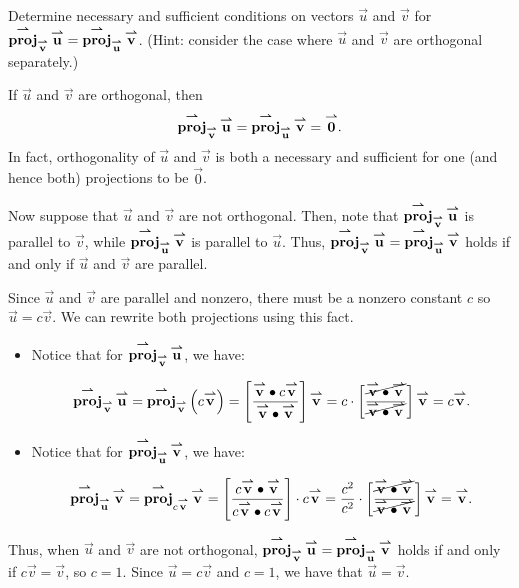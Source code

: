 \documentclass[noauthor, handout]{ximera}
\begin{document}
\begin{problem}
Determine necessary and sufficient conditions on vectors $\vec{u}$ and $\vec{v}$ for $\proj_\vec{v} \vec{u} = \proj_\vec{u} \vec{v}$. (Hint: consider the case where $\vec{u}$ and $\vec{v}$ are orthogonal separately.)

\begin{freeResponse}
If $\vec{u}$ and $\vec{v}$ are orthogonal, then
$$
\proj_\vec{v} \vec{u} = \proj_\vec{u} \vec{v} = \vec{0}.
$$
In fact, orthogonality of $\vec{u}$ and $\vec{v}$ is both a necessary and sufficient for one (and hence both) projections to be $\vec{0}$. 

Now suppose that $\vec{u}$ and $\vec{v}$ are not orthogonal. Then, note that $\proj_\vec{v} \vec{u}$ is parallel to $\vec{v}$, while $\proj_\vec{u} \vec{v}$ is parallel to $\vec{u}$.  Thus, $\proj_\vec{v} \vec{u}=\proj_\vec{u} \vec{v}$ holds if and only if $\vec{u}$ and $\vec{v}$ are parallel.

Since $\vec{u}$ and $\vec{v}$ are parallel and nonzero, there must be a nonzero constant $c$ so $\vec{u} = c \vec{v}$.  We can rewrite both projections using this fact.

\begin{itemize}
\item Notice that for $\proj_{\vec{v} } \vec{u}$, we have:

\[
\proj_{\vec{v} } \vec{u} = \proj_{\vec{v} } \left(c \vec{v}\right) = \left[\frac{\vec{v} \dotp c \vec{v}}{\vec{v} \dotp \vec{v} }\right] \vec{v} = c \cdot \left[\frac{\cancel{\vec{v} \dotp  \vec{v}}}{\cancel{\vec{v} \dotp \vec{v} }}\right] \vec{v} = c\vec{v}.
\]
\item Notice that for $\proj_{\vec{u} } \vec{v}$, we have:

\[
\proj_{\vec{u} } \vec{v} = \proj_{c\vec{v} } \vec{v} = \left[\frac{c \vec{v} \dotp \vec{v}}{c \vec{v} \dotp c \vec{v} }\right] \cdot c \vec{v} = \frac{c^2}{c^2} \cdot \left[\frac{\cancel{\vec{v} \dotp  \vec{v}}}{\cancel{\vec{v} \dotp \vec{v} }}\right] \vec{v} = \vec{v}.
\]
\end{itemize}


Thus, when $\vec{u}$ and $\vec{v}$ are not orthogonal, $\proj_\vec{v} \vec{u}=\proj_\vec{u} \vec{v}$ holds if and only if $c\vec{v} = \vec{v}$, so $c=1$.  Since $\vec{u} = c\vec{v}$ and $c=1$, we have that $\vec{u} = \vec{v}$.

\end{freeResponse}
\end{problem}
\end{document}
